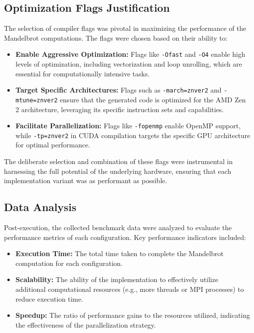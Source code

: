 \documentclass[
	report, %
	11pt, %
]{CSUniSchoolLabReport}
\newcounter{ct}
\begin{document}
\subsection{Optimization Flags Justification}

The selection of compiler flags was pivotal in maximizing the performance of the Mandelbrot computations. The flags were chosen based on their ability to:

\begin{itemize}
	\item \textbf{Enable Aggressive Optimization:} Flags like \texttt{-Ofast} and \texttt{-O4} enable high levels of optimization, including vectorization and loop unrolling, which are essential for computationally intensive tasks.
	\item \textbf{Target Specific Architectures:} Flags such as \texttt{-march=znver2} and \texttt{-mtune=znver2} ensure that the generated code is optimized for the AMD Zen 2 architecture, leveraging its specific instruction sets and capabilities.
	\item \textbf{Facilitate Parallelization:} Flags like \texttt{-fopenmp} enable OpenMP support, while \texttt{-tp=znver2} in CUDA compilation targets the specific GPU architecture for optimal performance.
\end{itemize}

The deliberate selection and combination of these flags were instrumental in harnessing the full potential of the underlying hardware, ensuring that each implementation variant was as performant as possible.

\subsection{Data Analysis}

Post-execution, the collected benchmark data were analyzed to evaluate the performance metrics of each configuration. Key performance indicators included:

\begin{itemize}
	\item \textbf{Execution Time:} The total time taken to complete the Mandelbrot computation for each configuration.
	\item \textbf{Scalability:} The ability of the implementation to effectively utilize additional computational resources (e.g., more threads or MPI processes) to reduce execution time.
	\item \textbf{Speedup:} The ratio of performance gains to the resources utilized, indicating the effectiveness of the parallelization strategy.
\end{itemize}
\end{document}
